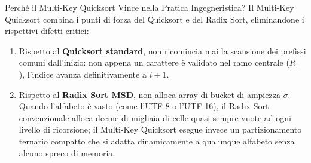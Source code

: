 \begin{table}[H]
\centering
\small
{}
\caption{Quadro sinottico comparativo tra gli algoritmi cardine per l'ordinamento di stringhe.}
\label{tab:string-sorting-comparison}
\end{table}

\begin{noteblock}{Perch\'e il Multi-Key Quicksort Vince nella Pratica Ingegneristica?}
Il Multi-Key Quicksort combina i punti di forza del Quicksort e del Radix Sort, eliminandone i rispettivi difetti critici:
\begin{enumerate}
  \item Rispetto al \textbf{Quicksort standard}, non ricomincia mai la scansione dei prefissi comuni dall'inizio: non appena un carattere \`e validato nel ramo centrale ($R_=$), l'indice avanza definitivamente a $i+1$.
  \item Rispetto al \textbf{Radix Sort MSD}, non alloca array di bucket di ampiezza $\sigma$. Quando l'alfabeto \`e vasto (come l'UTF-8 o l'UTF-16), il Radix Sort convenzionale alloca decine di migliaia di celle quasi sempre vuote ad ogni livello di ricorsione; il Multi-Key Quicksort esegue invece un partizionamento ternario compatto che si adatta dinamicamente a qualunque alfabeto senza alcuno spreco di memoria.
\end{enumerate}
\end{noteblock}
